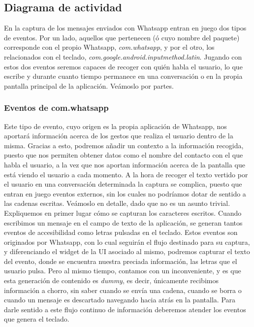 \documentclass[12pt,a4paper,oneside]{book} %
\begin{document}
\subsection{Diagrama de actividad}
En la captura de los mensajes enviados con Whatsapp entran en juego dos tipos de eventos. Por un lado, aquellos que pertenecen (ó cuyo nombre del paquete) corresponde con el propio Whatsapp, \textit{com.whatsapp}, y por el otro, los relacionados con el teclado, \textit{com.google.android.inputmethod.latin}.
\newline \newline 
Jugando con estos dos eventos seremos capaces de recoger con quién habla el usuario, lo que escribe y durante cuanto tiempo permanece en una conversación o en la propia pantalla principal de la aplicación. Veámoslo por partes. 
\subsubsection{Eventos de com.whatsapp} 
Este tipo de evento, cuyo origen es la propia aplicación de Whatsapp, nos aportará información acerca de los gestos que realiza el usuario dentro de la misma. Gracias a esto, podremos añadir un contexto a la información recogida, puesto que nos permiten obtener datos como el nombre del contacto con el que habla el usuario, a la vez que nos aportan información acerca de la pantalla que está viendo el usuario a cada momento.
\newline \newline
A la hora de recoger el texto vertido por el usuario en una conversación determinada la captura se complica, puesto que entran en juego eventos externos, sin los cuales no podríamos dotar de sentido a las cadenas escritas. Veámoslo en detalle, dado que no es un asunto trivial. Expliquemos en primer lugar cómo se capturan los caracteres escritos. 
\newline \newline 
Cuando escribimos un mensaje en el campo de texto de la aplicación, se generan tantos eventos de accesibilidad como letras pulsadas en el teclado. Estos eventos son originados por Whatsapp, con lo cual seguirán el flujo destinado para su captura, y diferenciando el widget de la UI asociado al mismo, podremos capturar el texto del evento, donde se encuentra nuestra preciada información, las letras que el usuario pulsa. 
\newline \newline
Pero al mismo tiempo, contamos con un inconveniente, y es que esta generación de contenido es \textit{dummy}, es decir, únicamente recibimos información a chorro, sin saber cuando se envía una cadena, cuando se borra o cuando un mensaje es descartado navegando hacia atrás en la pantalla. 
\newline \newline 
Para darle sentido a este flujo continuo de información deberemos atender los eventos que genera el teclado. 
\end{document}

